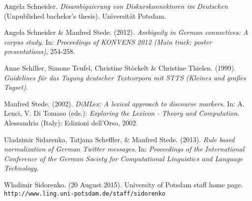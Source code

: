 \documentclass[11pt]{article}
\def\mono#1{\texttt{#1}}  %
\begin{document}
\begin{thebibliography}{} 

 Angela Schneider.  \emph{Disambiguierung von Diskurskonnektoren im Deutschen} (Unpublished bachelor's thesis). Universit{\"a}t Potsdam.

 Angela Schneider \& Manfred Stede.  (2012). \emph{Ambiguity in German connectives: A corpus study.}  In: \emph{Proceedings of KONVENS 2012 (Main track: poster presentations)}, 254-258.

 Anne Schiller, Simone Teufel, Christine St{\"o}ckelt \& Christine Thielen. (1999).  \emph{Guidelines f{\"u}r das Tagung deutscher Textcorpora mit STTS (Kleines und gro{\ss}es Tagset).}

Manfred Stede. (2002). \emph{DiMLex: A lexical approach to discourse markers}. In: A. Lenci, V. Di Tomaso (eds.): \emph{Exploring the Lexicon - Theory and Computation}. Alessandria (Italy): Edizioni dell'Orso, 2002.

 Uladzimir Sidarenka, Tatjana Scheffler, \& Manfred Stede.  (2013).  \emph{Rule based normalization of German Twitter messages}. In: \emph{Proceedings of the International Conference of the German Society for Computational Linguistics and Language Technology}.

 Wladimir Sidorenko.  (20 August 2015).  University of Potsdam staff home page.  \mono{http://www.ling.uni-potsdam.de/staff/sidorenko}

\end{thebibliography}
\end{document}
